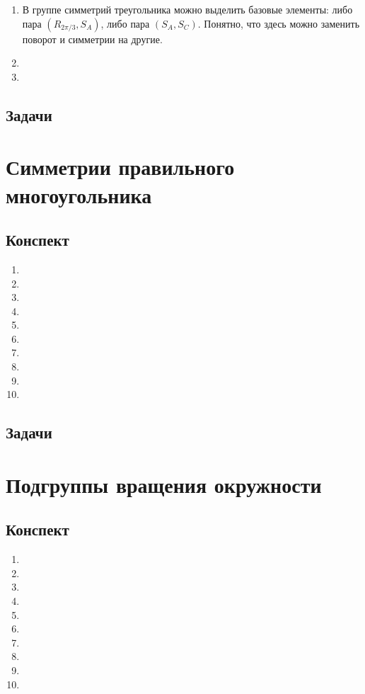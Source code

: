 \begin{enumerate}
\item В группе симметрий треугольника можно выделить базовые элементы: либо пара $(R_{2\pi/3}, S_A)$, либо пара $(S_A,S_C)$. Понятно, что здесь можно заменить поворот и симметрии на другие.
\item 
\item 
\end{enumerate}
\subsection{Задачи}




\section{Симметрии правильного многоугольника}

\subsection{Конспект}
\begin{enumerate}\setlength{\itemsep}{1pt}
\item 
\item 
\item 
\item 
\item 
\item 
\item 
\item 
\item 
\item 
\end{enumerate}
\subsection{Задачи}



\section{Подгруппы вращения окружности}

\subsection{Конспект}
\begin{enumerate}\setlength{\itemsep}{1pt}
\item 
\item 
\item 
\item 
\item 
\item 
\item 
\item 
\item 
\item 
\end{enumerate}
